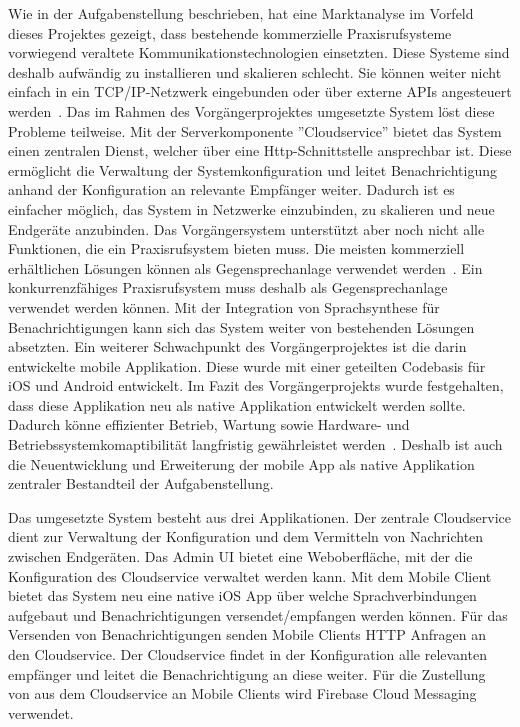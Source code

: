 Wie in der Aufgabenstellung beschrieben, hat eine Marktanalyse im Vorfeld dieses Projektes gezeigt, dass bestehende kommerzielle Praxisrufsysteme vorwiegend veraltete Kommunikationstechnologien einsetzten.
Diese Systeme sind deshalb aufwändig zu installieren und skalieren schlecht.
Sie können weiter nicht einfach in ein TCP/IP-Netzwerk eingebunden oder über externe APIs angesteuert werden~\cite{aufgabenstellung}.
Das im Rahmen des Vorgängerprojektes umgesetzte System löst diese Probleme teilweise.
Mit der Serverkomponente ''Cloudservice'' bietet das System einen zentralen Dienst, welcher über eine Http-Schnittstelle ansprechbar ist.
Diese ermöglicht die Verwaltung der Systemkonfiguration und leitet Benachrichtigung anhand der Konfiguration an relevante Empfänger weiter.
Dadurch ist es einfacher möglich, das System in Netzwerke einzubinden, zu skalieren und neue Endgeräte anzubinden.
Das Vorgängersystem unterstützt aber noch nicht alle Funktionen, die ein Praxisrufsystem bieten muss.
Die meisten kommerziell erhältlichen Lösungen können als Gegensprechanlage verwendet werden~\cite{aufgabenstellung}.
Ein konkurrenzfähiges Praxisrufsystem muss deshalb als Gegensprechanlage verwendet werden können.
Mit der Integration von Sprachsynthese für Benachrichtigungen kann sich das System weiter von bestehenden Lösungen absetzten.
Ein weiterer Schwachpunkt des Vorgängerprojektes ist die darin entwickelte mobile Applikation.
Diese wurde mit einer geteilten Codebasis für iOS und Android entwickelt.
Im Fazit des Vorgängerprojekts wurde festgehalten, dass diese Applikation neu als native Applikation entwickelt werden sollte.
Dadurch könne effizienter Betrieb, Wartung sowie Hardware- und Betriebssystemkomaptibilität langfristig gewährleistet werden~\cite{ip5}.
Deshalb ist auch die Neuentwicklung und Erweiterung der mobile App als native Applikation zentraler Bestandteil der Aufgabenstellung.

Das umgesetzte System besteht aus drei Applikationen.
Der zentrale Cloudservice dient zur Verwaltung der Konfiguration und dem Vermitteln von Nachrichten zwischen Endgeräten.
Das Admin UI bietet eine Weboberfläche, mit der die Konfiguration des Cloudservice verwaltet werden kann.
Mit dem Mobile Client bietet das System neu eine native iOS App über welche Sprachverbindungen aufgebaut und Benachrichtigungen versendet/empfangen werden können.
Für das Versenden von Benachrichtigungen senden Mobile Clients HTTP Anfragen an den Cloudservice.
Der Cloudservice findet in der Konfiguration alle relevanten empfänger und leitet die Benachrichtigung an diese weiter.
Für die Zustellung von aus dem Cloudservice an Mobile Clients wird Firebase Cloud Messaging verwendet.

